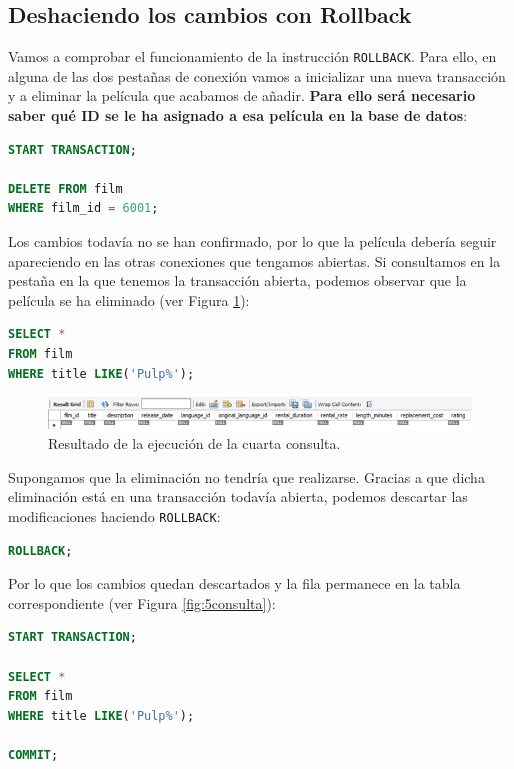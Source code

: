 \documentclass{db-practice}
\begin{document}
\subsection*{Deshaciendo los cambios con Rollback}

Vamos a comprobar el funcionamiento de la instrucción \texttt{ROLLBACK}. Para ello, en alguna de las dos pestañas de conexión vamos a inicializar una nueva transacción y a eliminar la película que acabamos de añadir. \textbf{Para ello será necesario saber qué ID se le ha asignado a esa película en la base de datos}:

\begin{lstlisting}[language=SQL]
START TRANSACTION;

DELETE FROM film 
WHERE film_id = 6001;
\end{lstlisting}

Los cambios todavía no se han confirmado, por lo que la película debería seguir apareciendo en las otras conexiones que tengamos abiertas. Si consultamos en la pestaña en la que tenemos la transacción abierta, podemos observar que la película se ha eliminado (ver Figura \ref{fig:4consulta}):

\begin{lstlisting}[language=SQL]
SELECT * 
FROM film
WHERE title LIKE('Pulp%');
\end{lstlisting}

\begin{figure}[ht]
    \centering
    \includegraphics[width=0.9\columnwidth]{figs/4consulta.png}
    \caption{Resultado de la ejecución de la cuarta consulta.}\label{fig:4consulta}
\end{figure}

Supongamos que la eliminación no tendría que realizarse. Gracias a que dicha eliminación está en una transacción todavía abierta, podemos descartar las modificaciones haciendo \texttt{ROLLBACK}:

\begin{lstlisting}[language=SQL]
ROLLBACK;
\end{lstlisting}

Por lo que los cambios quedan descartados y la fila permanece en la tabla correspondiente (ver Figura \ref{fig:5consulta}):

\begin{lstlisting}[language=SQL]
START TRANSACTION;

SELECT * 
FROM film
WHERE title LIKE('Pulp%');

COMMIT;
\end{lstlisting}
\end{document}
